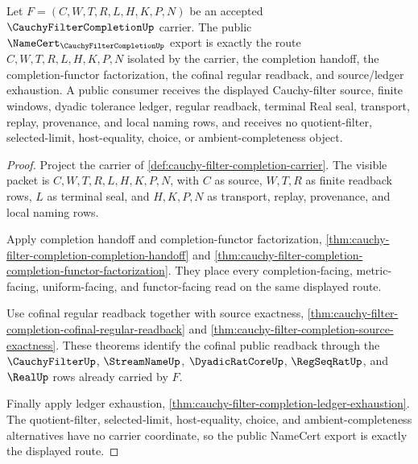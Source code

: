 \begin{theorem}
\label{thm:cauchyfiltercompletion-public-namecert}
Let $F=(C,W,T,R,L,H,K,P,N)$ be an accepted $\CauchyFilterCompletionUp$ carrier. The public $\NameCert_{\CauchyFilterCompletionUp}$ export is exactly the route $C,W,T,R,L,H,K,P,N$ isolated by the carrier, the completion handoff, the completion-functor factorization, the cofinal regular readback, and source/ledger exhaustion. A public consumer receives the displayed Cauchy-filter source, finite windows, dyadic tolerance ledger, regular readback, terminal Real seal, transport, replay, provenance, and local naming rows, and receives no quotient-filter, selected-limit, host-equality, choice, or ambient-completeness object.
\end{theorem}
\begin{proof}
Project the carrier of \autoref{def:cauchy-filter-completion-carrier}. The visible packet is $C,W,T,R,L,H,K,P,N$, with $C$ as source, $W,T,R$ as finite readback rows, $L$ as terminal seal, and $H,K,P,N$ as transport, replay, provenance, and local naming rows.

Apply completion handoff and completion-functor factorization, \autoref{thm:cauchy-filter-completion-completion-handoff} and \autoref{thm:cauchy-filter-completion-completion-functor-factorization}. They place every completion-facing, metric-facing, uniform-facing, and functor-facing read on the same displayed route.

Use cofinal regular readback together with source exactness, \autoref{thm:cauchy-filter-completion-cofinal-regular-readback} and \autoref{thm:cauchy-filter-completion-source-exactness}. These theorems identify the cofinal public readback through the $\CauchyFilterUp$, $\StreamNameUp$, $\DyadicRatCoreUp$, $\RegSeqRatUp$, and $\RealUp$ rows already carried by $F$.

Finally apply ledger exhaustion, \autoref{thm:cauchy-filter-completion-ledger-exhaustion}. The quotient-filter, selected-limit, host-equality, choice, and ambient-completeness alternatives have no carrier coordinate, so the public NameCert export is exactly the displayed route.
\end{proof}
